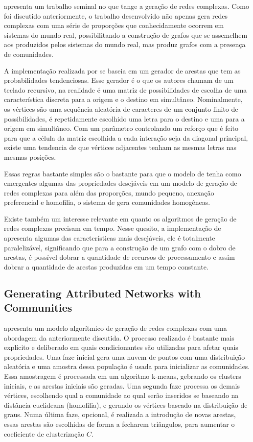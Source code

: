 \documentclass[notes.tex]{subfiles}
\begin{document}
 apresenta um trabalho seminal no que tange a geração de redes complexas.
Como foi discutido anteriormente, o trabalho desenvolvido não apenas gera redes complexas com uma série de proporções que conhecidamente ocorrem em sistemas do mundo real, possibilitando a construção de grafos que se assemelhem aos produzidos pelos sistemas do mundo real, mas produz grafos com a presença de comunidades.

A implementação realizada por  se baseia em um gerador de arestas que tem as probabilidades tendenciosas.
Esse gerador é o que os autores chamam de um teclado recursivo, na realidade é uma matriz de possibilidades de escolha de uma característica discreta para a origem e o destino em simultâneo.
Nominalmente, os vértices são uma sequência aleatória de caracteres de um conjunto finito de possibilidades, é repetidamente escolhido uma letra para o destino e uma para a origem em simultâneo.
Com um parâmetro controlando um reforço que é feito para que a célula da matriz escolhida a cada interação seja da diagonal principal, existe uma tendencia de que vértices adjacentes tenham as mesmas letras nas mesmas posições.

Essas regras bastante simples são o bastante para que o modelo de  tenha como emergentes algumas das propriedades desejáveis em um modelo de geração de redes complexas
para além das proporções, mundo pequeno, anexação preferencial e homofilia, o sistema de  gera comunidades homogêneas.

Existe também um interesse relevante em quanto os algoritmos de geração de redes complexas precisam em tempo.
Nesse quesito, a implementação de  apresenta algumas das características mais desejáveis, ele é totalmente paralelizável, significando que para a construção de um grafo com o dobro de arestas, é possível dobrar a quantidade de recursos de processamento e assim dobrar a quantidade de arestas produzidas em um tempo constante.

\subsection{Generating Attributed Networks with Communities}

 apresenta um modelo algorítmico de geração de redes complexas com uma abordagem da anteriormente discutida.
O processo realizado é bastante mais explícito e deliberado em quais condicionantes são utilizadas para afetar quais propriedades.
Uma faze inicial gera uma nuvem de pontos com uma distribuição aleatória e uma amostra dessa população é usada para inicializar as comunidades.
Essa amostragem é processada em um algoritmo k-means, gebrando os clusters iniciais, e as arestas iniciais são geradas.
Uma segunda faze processa os demais vértices, escolhendo qual a comunidade ao qual serão inseridos se baseando na distância euclideana (homofilia), e gerando os vértices baseado na distribuição de graus.
Numa última faze, opcional, é realizada a introdução de novas arestas, essas arestas são escolhidas de forma a fecharem triângulos, para aumentar o coeficiente de clusterização $C$.
\end{document}
